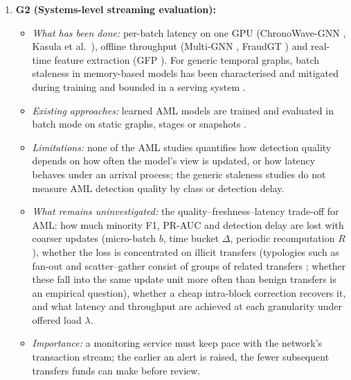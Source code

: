 \documentclass[11pt,a4paper]{article}
\begin{document}
\begin{enumerate}[leftmargin=*]
    \item \textbf{G2 (Systems-level streaming evaluation):}
    \begin{itemize}[leftmargin=*]
        \item \textit{What has been done:} per-batch latency on one GPU (ChronoWave-GNN \cite{lin2026chronowave}, Kasula et al.\ \cite{kasula2025ajk}), offline throughput (Multi-GNN \cite{egressy2024multigraph}, FraudGT \cite{lin2024fraudgt}) and real-time feature extraction (GFP \cite{blanusa2024gfp}). For generic temporal graphs, batch staleness in memory-based models has been characterised and mitigated during training \cite{su2024pres,zhou2025badgnn,anchorrm2026} and bounded in a serving system \cite{streamtgn2026}.
        \item \textit{Existing approaches:} learned AML models are trained and evaluated in batch mode on static graphs, stages or snapshots \cite{tian2025kar,jia2025lmae4eth,rico2026taml,lin2026chronowave}.
        \item \textit{Limitations:} none of the AML studies quantifies how detection quality depends on how often the model's view is updated, or how latency behaves under an arrival process; the generic staleness studies do not measure AML detection quality by class or detection delay.
        \item \textit{What remains uninvestigated:} the quality--freshness--latency trade-off for AML: how much minority F1, PR-AUC and detection delay are lost with coarser updates (micro-batch $b$, time bucket $\Delta$, periodic recomputation $R$), whether the loss is concentrated on illicit transfers (typologies such as fan-out and scatter--gather consist of groups of related transfers \cite{altman2023ibmaml}; whether these fall into the same update unit more often than benign transfers is an empirical question), whether a cheap intra-block correction recovers it, and what latency and throughput are achieved at each granularity under offered load $\lambda$.
        \item \textit{Importance:} a monitoring service must keep pace with the network's transaction stream; the earlier an alert is raised, the fewer subsequent transfers funds can make before review.
    \end{itemize}


\end{enumerate}
\end{document}
